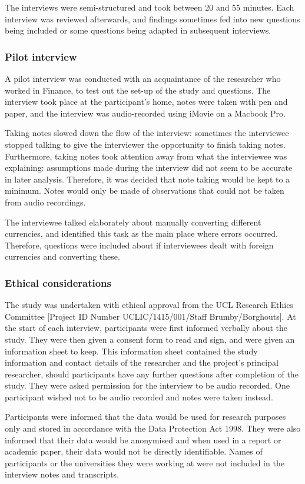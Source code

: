 The interviews were semi-structured and took between 20 and 55 minutes. Each interview was reviewed afterwards, and findings sometimes fed into new questions being included or some questions being adapted in subsequent interviews.

\subsubsection{Pilot interview}
A pilot interview was conducted with an acquaintance of the researcher who worked in Finance, to test out the set-up of the study and questions. The interview took place at the participant's home, notes were taken with pen and paper, and the interview was audio-recorded using iMovie on a Macbook Pro. 

Taking notes slowed down the flow of the interview: sometimes the interviewee stopped talking to give the interviewer the opportunity to finish taking notes. Furthermore, taking notes took attention away from what the interviewee was explaining: assumptions made during the interview did not seem to be accurate in later analysis. Therefore, it was decided that note taking would be kept to a minimum. Notes would only be made of observations that could not be taken from audio recordings.

The interviewee talked elaborately about manually converting different currencies, and identified this task as the main place where errors occurred. Therefore, questions were included about if interviewees dealt with foreign currencies and converting these. 

\subsubsection{Ethical considerations}
The study was undertaken with ethical approval from the UCL Research Ethics Committee [Project ID Number UCLIC/1415/001/Staff Brumby/Borghouts]. 
At the start of each interview, participants were first informed verbally about the study. They were then given a consent form to read and sign, and were given an information sheet to keep. This information sheet contained the study information and contact details of the researcher and the project's principal researcher, should participants have any further questions after completion of the study.  They were asked permission for the interview to be audio recorded. One participant wished not to be audio recorded and notes were taken instead. 

Participants were informed that the data would be used for research purposes only and stored in accordance with the Data Protection Act 1998. They were also informed that their data would be anonymised and when used in a report or academic paper, their data would not be directly identifiable. Names of participants or the universities they were working at were not included in the interview notes and transcripts.
 
